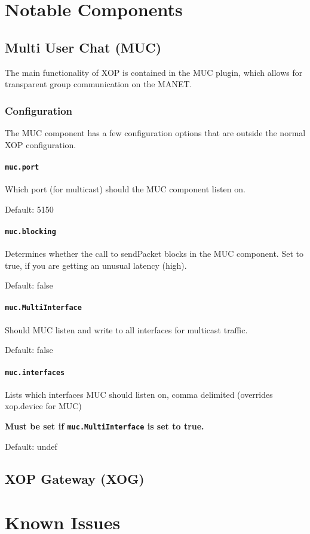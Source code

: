 \documentclass[draft]{article}
\begin{document}
\section{Notable Components}
\subsection{Multi User Chat (MUC)}
The main functionality of XOP is contained in the MUC plugin, which allows for transparent group communication on the MANET.
\subsubsection{Configuration}
The MUC component has a few configuration options that are outside the normal XOP configuration. 

\paragraph{\texttt{muc.port}}
Which port (for multicast) should the MUC component listen on.

Default: 5150
\paragraph{\texttt{muc.blocking}}
Determines whether the call to sendPacket blocks in the MUC component. Set to true, if you are getting an unusual latency (high).

Default: false
\paragraph{\texttt{muc.MultiInterface}}
Should MUC listen and write to all interfaces for multicast traffic.

Default: false
\paragraph{\texttt{muc.interfaces}}
Lists which interfaces MUC should listen on, comma delimited (overrides xop.device for MUC)

\textbf{Must be set if \texttt{muc.MultiInterface} is set to true. }

Default: undef
\subsection{XOP Gateway (XOG)}

\section{Known Issues}
\end{document}
